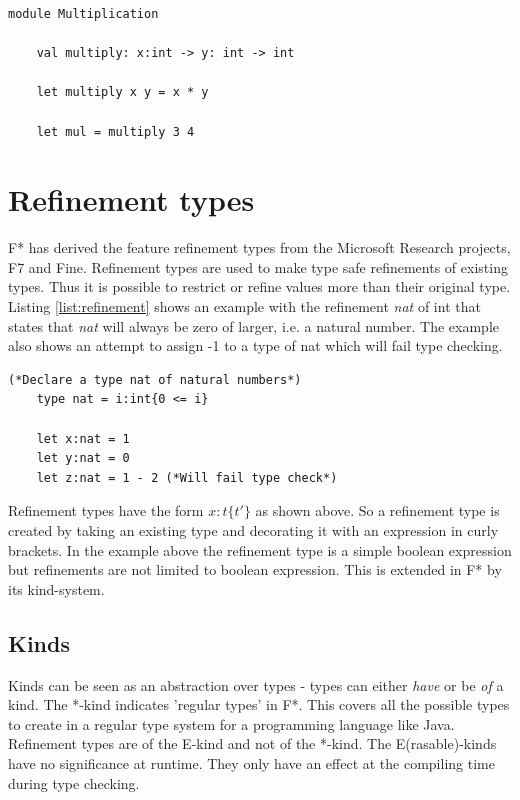 \documentclass[twosided]{report}
\begin{document}
\begin{lstlisting}[style=fstar, caption={Multiplication example in F*}, label={list:multiply}]
	module Multiplication

	val multiply: x:int -> y: int -> int
	
	let multiply x y = x * y
	
	let mul = multiply 3 4
\end{lstlisting}

\section{Refinement types}
F* has derived the feature refinement types from the Microsoft Research projects, F7 and Fine. Refinement types are used to make type safe refinements of existing types. Thus it is possible to restrict or refine values more than their original type. Listing \ref{list:refinement} shows an example with the refinement \emph{nat} of int that states that \emph{nat} will always be zero of larger, i.e. a natural number. The example also shows an attempt to assign -1 to a type of nat which will fail type checking.
\clearpage
\begin{lstlisting}[style=fstar, caption={Simple refinement types in F*}, label={list:refinement}]
	(*Declare a type nat of natural numbers*)	
	type nat = i:int{0 <= i}
	
	let x:nat = 1
	let y:nat = 0
	let z:nat = 1 - 2 (*Will fail type check*)
\end{lstlisting}

Refinement types have the form $x:t\{t'\}$ as shown above. So a refinement type is created by taking an existing type and decorating it with an expression in curly brackets. In the example above the refinement type is a simple boolean expression but refinements are not limited to boolean expression. This is extended in F* by its kind-system.

\subsection{Kinds}
Kinds can be seen as an abstraction over types - types can either \emph{have} or be \emph{of} a kind. The *-kind indicates 'regular types' in F*. This covers all the possible types to create in a regular type system for a programming language like Java. Refinement types are of the E-kind and not of the *-kind. The E(rasable)-kinds have no significance at runtime. They only have an effect at the compiling time during type checking.
\end{document}
